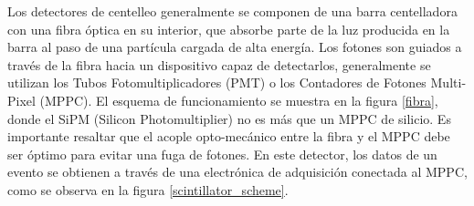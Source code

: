 \documentclass[12pt,oneside,openany,letter]{book}
\begin{document}
Los detectores de centelleo generalmente se componen de una barra centelladora con una fibra óptica en su interior, que absorbe parte de la luz producida en la barra al paso de una partícula cargada de alta energía. Los fotones son guiados a trav\'es de la fibra hacia un dispositivo capaz de detectarlos, generalmente se utilizan los Tubos Fotomultiplicadores (PMT) o los Contadores de Fotones Multi-Pixel (MPPC). El esquema de funcionamiento se muestra en la figura \ref{fibra}, donde el SiPM (Silicon Photomultiplier) no es m\'as que un MPPC de silicio. Es importante resaltar que el acople opto-mec\'anico entre la fibra y el MPPC debe ser óptimo para evitar una fuga de fotones. En este detector, los datos de un evento se obtienen a través de una electrónica de adquisición conectada al MPPC, como se observa en la figura \ref{scintillator_scheme}.
\end{document}
